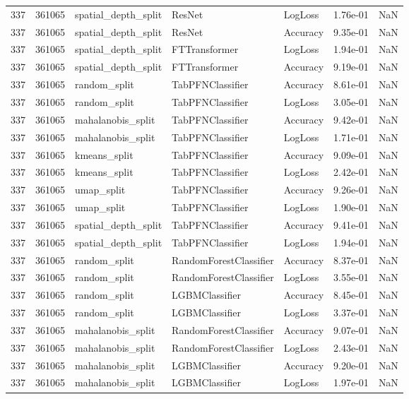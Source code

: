 \begin{tabular}{rrlllrr}
337 & 361065 & spatial\_depth\_split & ResNet & LogLoss & 1.76e-01 & NaN \\
337 & 361065 & spatial\_depth\_split & ResNet & Accuracy & 9.35e-01 & NaN \\
337 & 361065 & spatial\_depth\_split & FTTransformer & LogLoss & 1.94e-01 & NaN \\
337 & 361065 & spatial\_depth\_split & FTTransformer & Accuracy & 9.19e-01 & NaN \\
337 & 361065 & random\_split & TabPFNClassifier & Accuracy & 8.61e-01 & NaN \\
337 & 361065 & random\_split & TabPFNClassifier & LogLoss & 3.05e-01 & NaN \\
337 & 361065 & mahalanobis\_split & TabPFNClassifier & Accuracy & 9.42e-01 & NaN \\
337 & 361065 & mahalanobis\_split & TabPFNClassifier & LogLoss & 1.71e-01 & NaN \\
337 & 361065 & kmeans\_split & TabPFNClassifier & Accuracy & 9.09e-01 & NaN \\
337 & 361065 & kmeans\_split & TabPFNClassifier & LogLoss & 2.42e-01 & NaN \\
337 & 361065 & umap\_split & TabPFNClassifier & Accuracy & 9.26e-01 & NaN \\
337 & 361065 & umap\_split & TabPFNClassifier & LogLoss & 1.90e-01 & NaN \\
337 & 361065 & spatial\_depth\_split & TabPFNClassifier & Accuracy & 9.41e-01 & NaN \\
337 & 361065 & spatial\_depth\_split & TabPFNClassifier & LogLoss & 1.94e-01 & NaN \\
337 & 361065 & random\_split & RandomForestClassifier & Accuracy & 8.37e-01 & NaN \\
337 & 361065 & random\_split & RandomForestClassifier & LogLoss & 3.55e-01 & NaN \\
337 & 361065 & random\_split & LGBMClassifier & Accuracy & 8.45e-01 & NaN \\
337 & 361065 & random\_split & LGBMClassifier & LogLoss & 3.37e-01 & NaN \\
337 & 361065 & mahalanobis\_split & RandomForestClassifier & Accuracy & 9.07e-01 & NaN \\
337 & 361065 & mahalanobis\_split & RandomForestClassifier & LogLoss & 2.43e-01 & NaN \\
337 & 361065 & mahalanobis\_split & LGBMClassifier & Accuracy & 9.20e-01 & NaN \\
337 & 361065 & mahalanobis\_split & LGBMClassifier & LogLoss & 1.97e-01 & NaN \\

\end{tabular}
